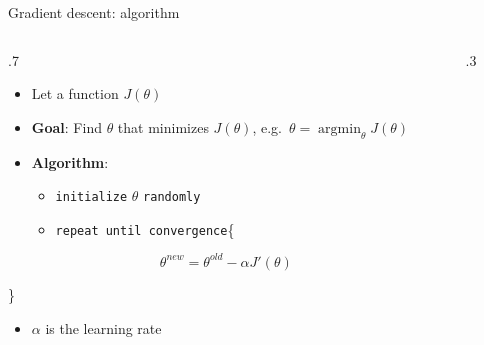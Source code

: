 \documentclass[
  9pt,
  ignorenonframetext,
  aspectratio=169,
  t, dvipsnames]{beamer}
\providecommand{\tightlist}{%
  \setlength{\itemsep}{0pt}\setlength{\parskip}{0pt}}\usepackage{longtable,booktabs,array}
\DeclareMathOperator*{\argmin}{argmin}
\theoremstyle{definition}
\def\begincols{\begin{columns}}
\def\begincol{\begin{column}}
\def\endcol{\end{column}}
\def\endcols{\end{columns}}
\begin{document}
\begin{frame}[fragile]{Gradient descent: algorithm}
\protect\hypertarget{gradient-descent-algorithm}{}
\begincols

\begincol{.7\textwidth}

\begin{itemize}
\item
  Let a function \(J(\theta)\)
\item
  \textbf{Goal}: Find \(\theta\) that minimizes \(J(\theta)\),
  e.g.~\(\theta = \argmin_{\theta} J(\theta)\)
\item
  \textbf{Algorithm}:

  \begin{itemize}
  \tightlist
  \item
    \texttt{initialize} \(\theta\) \texttt{randomly}
  \item
    \texttt{repeat\ until\ convergence}\{
  \end{itemize}
\end{itemize}

\[\theta^{new} = \theta^{old} - \alpha J'(\theta)\]

\text{                            } \}

\begin{itemize}
\tightlist
\item
  \(\alpha\) is the learning rate
\end{itemize}

\endcol
\begincol{.3\textwidth}
\endcol
\endcols
\end{frame}
\end{document}

